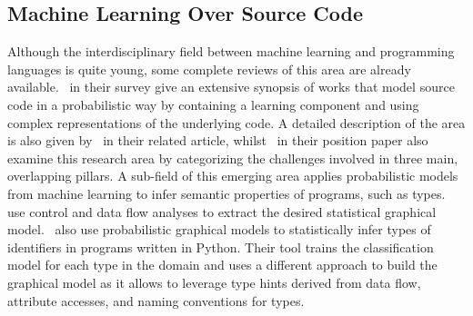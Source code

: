 \documentclass[sigplan,10pt,anonymous]{acmart} %
\theoremstyle{plain}
\theoremstyle{remark}
\theoremstyle{definition}
\begin{document}


%

\subsection{Machine Learning Over Source Code}

Although the interdisciplinary field between machine learning and programming
languages is quite young, some complete reviews of this area are
already available.~\citet{allamanis17} in their survey give an extensive
synopsis of works that model source code in a probabilistic way by containing
a learning component and using complex representations of the underlying
code. A detailed description of the area is also given by~\citet{vechev16} in
their related article, whilst~\citet{threepillars}
in their position paper also examine this research area by categorizing
the challenges involved in three main, overlapping pillars. A sub-field of this
emerging area applies probabilistic models from machine learning to infer semantic
properties  of programs, such as types.
~\citet{chibotaru19} use control and data flow analyses to extract
the desired statistical graphical model.~\citet{xu16} also use probabilistic graphical models to statistically infer
types of identifiers in programs written in Python. Their tool trains the
classification model for each type in the domain and uses a different
approach to build the graphical model as it allows to leverage type hints
derived from data flow, attribute accesses, and naming conventions for types.
\end{document}

